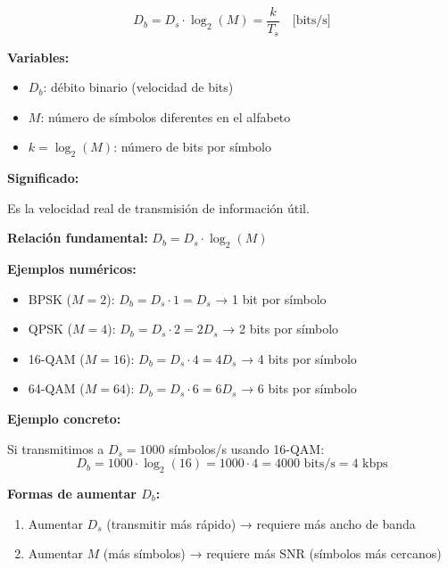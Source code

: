 \documentclass[11pt,a4paper]{article}
\begin{document}
\begin{tcolorbox}[colback=verdeclaro!20,colframe=azuloscuro,title=\textbf{Débito binario (Bit Rate)}]
$$\boxed{D_b = D_s \cdot \log_2(M) = \frac{k}{T_s} \quad \text{[bits/s]}}$$

\textbf{Variables:}
\begin{itemize}
\item $D_b$: débito binario (velocidad de bits)
\item $M$: número de símbolos diferentes en el alfabeto
\item $k = \log_2(M)$: número de bits por símbolo
\end{itemize}

\textbf{Significado:}

Es la velocidad real de transmisión de información útil.

\textbf{Relación fundamental:} $D_b = D_s \cdot \log_2(M)$

\textbf{Ejemplos numéricos:}
\begin{itemize}
\item BPSK ($M=2$): $D_b = D_s \cdot 1 = D_s$ → 1 bit por símbolo
\item QPSK ($M=4$): $D_b = D_s \cdot 2 = 2D_s$ → 2 bits por símbolo
\item 16-QAM ($M=16$): $D_b = D_s \cdot 4 = 4D_s$ → 4 bits por símbolo
\item 64-QAM ($M=64$): $D_b = D_s \cdot 6 = 6D_s$ → 6 bits por símbolo
\end{itemize}

\textbf{Ejemplo concreto:}

Si transmitimos a $D_s = 1000$ símbolos/s usando 16-QAM:
$$D_b = 1000 \cdot \log_2(16) = 1000 \cdot 4 = 4000 \text{ bits/s} = 4 \text{ kbps}$$

\textbf{Formas de aumentar $D_b$:}
\begin{enumerate}
\item Aumentar $D_s$ (transmitir más rápido) → requiere más ancho de banda
\item Aumentar $M$ (más símbolos) → requiere más SNR (símbolos más cercanos)
\end{enumerate}
\end{tcolorbox}
\end{document}
